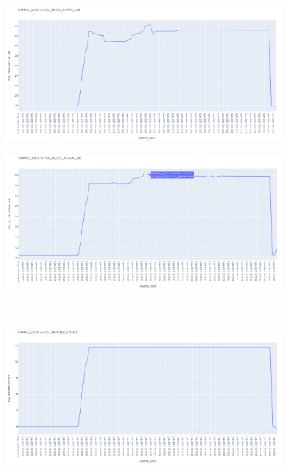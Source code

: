 \documentclass{article}
\begin{document}
\begin{figure}[ht!]
  \begin{subfigure}{0.5\textwidth}
    \centering  
    \includegraphics[width=0.9\linewidth]{t05-grafica01}
    \caption{}
  \end{subfigure} 
  \begin{subfigure}{0.5\textwidth}
    \centering  
    \includegraphics[width=0.9\linewidth]{t05-grafica02}
    \caption{}
  \end{subfigure} 
  \newline
  \\[3mm]
  \begin{subfigure}{0.5\textwidth}
    \centering  
    \includegraphics[width=0.9\linewidth]{t05-grafica03}
    \caption{}
  \end{subfigure} 
\end{figure}
\end{document}
